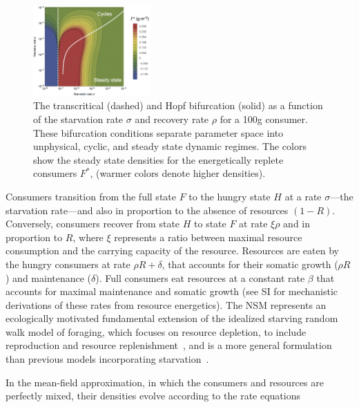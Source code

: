 \documentclass{pnastwo}
\begin{document}
\begin{article}
\begin{figure}
\centering
\includegraphics[width=0.4\textwidth]{fig_FixedPoint2.eps}
\caption{\small{ The transcritical (dashed) and Hopf bifurcation (solid) as a
  function of the starvation rate $\sigma$ and recovery rate $\rho$ for a 100g consumer.  These
  bifurcation conditions separate parameter space into unphysical, cyclic,
  and steady state dynamic regimes.  The colors show the steady state densities for the energetically replete consumers $F^*$, (warmer colors denote higher densities).  
}\label{fig:fp}}
\end{figure}

Consumers transition from the full state $F$ to the hungry state $H$ at a rate $\sigma$---the starvation rate---and also in proportion to the absence of resources $(1-R)$.  Conversely, consumers recover from state $H$ to state $F$ at rate $\xi \rho$ and in proportion to $R$, where $\xi$ represents a ratio between maximal resource consumption and the carrying capacity of the resource. %
Resources are eaten by the hungry consumers at rate $\rho R + \delta$, that accounts for their somatic growth ($\rho R$) and  maintenance ($\delta$). Full consumers eat resources at a constant rate $\beta$ that accounts for maximal maintenance and somatic growth (see SI for mechanistic derivations of these rates from resource energetics).
The NSM represents an ecologically motivated fundamental extension of the idealized starving random walk model of foraging, which focuses on resource depletion, to include reproduction and resource replenishment~\cite{Benichou:2014wu,Benichou:2016wl,Chupeau:2016jf}, and is a more general formulation than previous models incorporating starvation~\cite{Persson:1998hz}.


In the mean-field approximation, in which the consumers and resources are perfectly mixed, their densities evolve according to the rate equations


\end{article}
\end{document}
